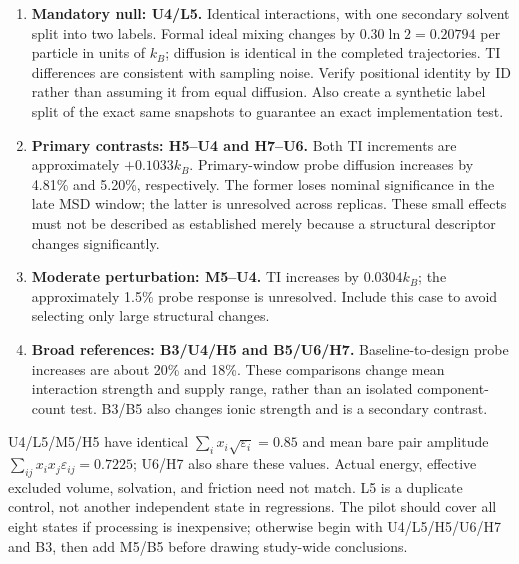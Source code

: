 \documentclass[11pt,a4paper]{article}
\begin{document}
\begin{enumerate}
\item \textbf{Mandatory null: U4/L5.} Identical interactions, with one secondary
solvent split into two labels. Formal ideal mixing changes by
$0.30\ln2=0.20794$ per particle in units of $k_B$; diffusion is identical in
the completed trajectories. TI differences are consistent with sampling noise.
Verify positional identity by ID rather than assuming it from equal diffusion.
Also create a synthetic label split of the exact same snapshots to guarantee
an exact implementation test.
\item \textbf{Primary contrasts: H5--U4 and H7--U6.} Both TI increments are
approximately $+0.1033k_B$. Primary-window probe diffusion increases by
4.81\% and 5.20\%, respectively. The former loses nominal significance in
the late MSD window; the latter is unresolved across replicas. These small
effects must not be described as established merely because a structural
descriptor changes significantly.
\item \textbf{Moderate perturbation: M5--U4.} TI increases by $0.0304k_B$;
the approximately 1.5\% probe response is unresolved. Include this case to
avoid selecting only large structural changes.
\item \textbf{Broad references: B3/U4/H5 and B5/U6/H7.} Baseline-to-design
probe increases are about 20\% and 18\%. These comparisons change mean
interaction strength and supply range, rather than an isolated component-count
test. B3/B5 also changes ionic strength and is a secondary contrast.
\end{enumerate}

U4/L5/M5/H5 have identical $\sum_i x_i\sqrt{\varepsilon_i}=0.85$ and mean
bare pair amplitude $\sum_{ij}x_ix_j\varepsilon_{ij}=0.7225$; U6/H7 also
share these values. Actual energy, effective excluded volume, solvation, and
friction need not match. L5 is a duplicate control, not another independent
state in regressions. The pilot should cover all eight states if processing
is inexpensive; otherwise begin with U4/L5/H5/U6/H7 and B3, then add M5/B5
before drawing study-wide conclusions.
\end{document}
